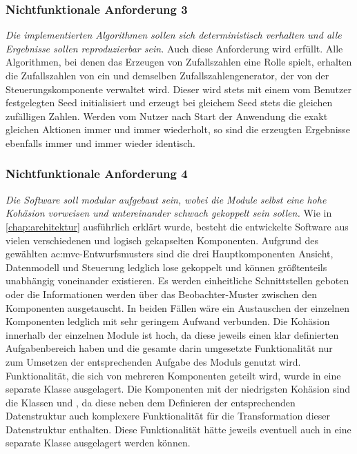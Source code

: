 \subsubsection{Nichtfunktionale Anforderung 3}
\textit{Die implementierten Algorithmen sollen sich deterministisch verhalten und alle Ergebnisse sollen reproduzierbar sein.} Auch diese Anforderung
wird erfüllt. Alle Algorithmen, bei denen das Erzeugen von Zufallszahlen eine Rolle spielt, erhalten die Zufallszahlen von ein und demselben
Zufallszahlengenerator, der von der Steuerungskomponente verwaltet wird. Dieser wird stets mit einem vom Benutzer festgelegten Seed initialisiert und
erzeugt bei gleichem Seed stets die gleichen zufälligen Zahlen. Werden vom Nutzer nach Start der Anwendung die exakt gleichen Aktionen immer und immer
wiederholt, so sind die erzeugten Ergebnisse ebenfalls immer und immer wieder identisch.

\subsubsection{Nichtfunktionale Anforderung 4}
\textit{Die Software soll modular aufgebaut sein, wobei die Module selbst eine hohe Kohäsion vorweisen und untereinander schwach gekoppelt sein sollen.}
Wie in \autoref{chap:architektur} ausführlich erklärt wurde, besteht die entwickelte Software aus vielen verschiedenen und logisch gekapselten Komponenten.
Aufgrund des gewählten \gls{ac:mvc}-Entwurfsmusters sind die drei Hauptkomponenten Ansicht, Datenmodell und Steuerung ledglich lose gekoppelt und können
größtenteils unabhängig voneinander existieren. Es werden einheitliche Schnittstellen geboten oder die Informationen werden über das Beobachter-Muster
zwischen den Komponenten ausgetauscht. In beiden Fällen wäre ein Austauschen der einzelnen Komponenten ledglich mit sehr geringem Aufwand verbunden. Die
Kohäsion innerhalb der einzelnen Module ist hoch, da diese jeweils einen klar definierten Aufgabenbereich haben und die gesamte darin umgesetzte Funktionalität
nur zum Umsetzen der entsprechenden Aufgabe des Moduls genutzt wird. Funktionalität, die sich von mehreren Komponenten geteilt wird, wurde in eine separate
Klasse  ausgelagert. Die Komponenten mit der niedrigsten Kohäsion sind die Klassen  und , da diese neben dem
Definieren der entsprechenden Datenstruktur auch komplexere Funktionalität für die Transformation dieser Datenstruktur enthalten. Diese Funktionalität
hätte jeweils eventuell auch in eine separate Klasse ausgelagert werden können.

